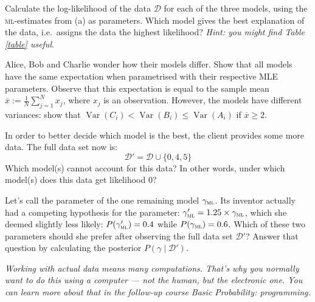 \documentclass[a4paper,10pt,landscape,twocolumn]{scrartcl}
\DeclareMathOperator{\Var}{Var}
\begin{document}
\begin{exercise}
	\begin{subex}[1pt]
		Calculate the log-likelihood of the data $\mathcal D$ for each of the three models, using the \textsc{ml}-estimates from (a) as parameters. Which model gives the best explanation of the data, i.e.\ assigns the data the highest likelihood? \emph{Hint: you might find Table \ref{table} useful}.
	\end{subex}
	
	\begin{subex}[1pt]
		Alice, Bob and Charlie wonder how their models differ. Show that all models have the same expectation when parametrised with their respective MLE parameters. Observe that this expectation is equal to the sample mean $\overline x := \frac{1}{N} \sum_{j=1}^N x_j$, where $x_j$ is an observation. However, the models have different variances: show that $\Var(C_i) < \Var(B_i) \le \Var(A_i)$ if $\overline x \ge 2$. 	\end{subex}
	
	\begin{subex}[0.5pt]
		In order to better decide which model is the best, the client provides some more data. The full
		data set now is:
		\[
			\mathcal D' = \mathcal D \cup \{ 0, 4, 5 \}
		\]
		Which model(s) cannot account for this data? In other words, under which model(s) does this data get likelihood 0?
	\end{subex}
	
	\begin{subex}[1pt]
	Let's call the parameter of the one remaining model	$\gamma_\textsc{ml}$. Its inventor actually had a competing hypothesis for the parameter: $\gamma_\textsc{ml}' = 1.25 \times \gamma_\textsc{ml}$, which she deemed slightly less likely: $P(\gamma_\textsc{ml}') = 0.4$ while $P(\gamma_\textsc{ml}) = 0.6$. Which of these two parameters should she prefer after observing the full data set $\mathcal{D'}$? Answer that question by calculating the posterior $P(\gamma \mid \mathcal{D'})$.
	\end{subex}
	
	\bigbreak\noindent
	\emph{Working with actual data means many computations. That's why you normally want to do this using a computer --- not the human, but the electronic one. You can learn more about that in the follow-up course \emph{Basic Probability: programming}.}
\end{exercise}
\end{document}
